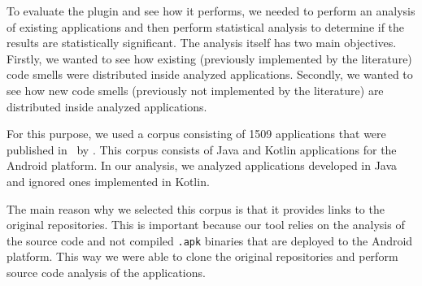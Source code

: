 
To evaluate the plugin and see how it performs, we needed to perform an analysis of existing applications and then
perform statistical analysis to determine if the results are statistically significant.
The analysis itself has two main objectives.
Firstly, we wanted to see how existing (previously implemented  by the literature) code smells were distributed
inside analyzed applications.
Secondly, we wanted to see how new code smells (previously not implemented by the literature) are distributed
inside analyzed applications.


For this purpose, we used a corpus consisting of 1509 applications that were published in~\cite{kotlin_android_corpus} by
\citeauthor{kotlin_android_corpus}.
This corpus consists of Java and Kotlin applications for the Android platform.
In our analysis, we analyzed applications developed in Java and ignored ones implemented in Kotlin.

The main reason why we selected this corpus is that it provides links to the original repositories.
This is important because our tool relies on the analysis of the source code and not compiled \verb|.apk| binaries
that are deployed to the Android platform.
This way we were able to clone the original repositories and perform source code analysis of the applications.
